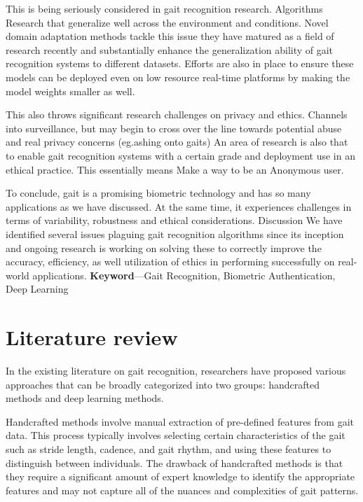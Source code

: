 \documentclass[a4paper]{article}
\begin{document}
This is being seriously considered in gait recognition research. Algorithms Research that generalize well across the environment and conditions. Novel domain adaptation methods tackle this issue they have matured as a field of research recently and substantially enhance the generalization ability of gait recognition systems to different datasets. Efforts are also in place to ensure these models can be deployed even on low resource real-time platforms by making the model weights smaller as well.

This also throws significant research challenges on privacy and ethics. Channels into surveillance, but may begin to cross over the line towards potential abuse and real privacy concerns (eg.ashing onto gaits) An area of research is also that to enable gait recognition systems with a certain grade and deployment use in an ethical practice. This essentially means Make a way to be an Anonymous user.

To conclude, gait is a promising biometric technology and has so many applications as we have discussed. At the same time, it experiences challenges in terms of variability, robustness and ethical considerations. Discussion We have identified several issues plaguing gait recognition algorithms since its inception and ongoing research is working on solving these to correctly improve the accuracy, efficiency, as well utilization of ethics in performing successfully on real-world applications.
\newline\newline
\textbf{Keyword}—Gait Recognition, Biometric Authentication, Deep Learning



\section{\textsf{Literature review}}
\cite{5} In the existing literature on gait recognition, researchers have proposed various approaches that can be broadly categorized into two groups: handcrafted methods and deep learning methods.


Handcrafted methods involve manual extraction of pre-defined features from gait
data. This process typically involves selecting certain characteristics of the gait such as stride length, cadence, and gait rhythm, and using these features to distinguish between individuals. The drawback of handcrafted methods is that they require a significant amount of expert knowledge to identify the appropriate features and may not capture all of the nuances and complexities of gait patterns.
\end{document}
